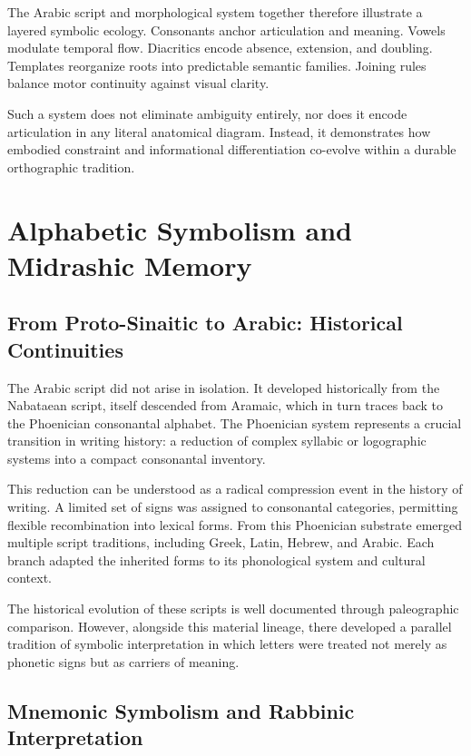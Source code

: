 \documentclass[11pt]{article}
\begin{document}
The Arabic script and morphological system together therefore illustrate a layered symbolic ecology. Consonants anchor articulation and meaning. Vowels modulate temporal flow. Diacritics encode absence, extension, and doubling. Templates reorganize roots into predictable semantic families. Joining rules balance motor continuity against visual clarity.

Such a system does not eliminate ambiguity entirely, nor does it encode articulation in any literal anatomical diagram. Instead, it demonstrates how embodied constraint and informational differentiation co-evolve within a durable orthographic tradition.

\section{Alphabetic Symbolism and Midrashic Memory}

\subsection{From Proto-Sinaitic to Arabic: Historical Continuities}

The Arabic script did not arise in isolation. It developed historically from the Nabataean script, itself descended from Aramaic, which in turn traces back to the Phoenician consonantal alphabet. The Phoenician system represents a crucial transition in writing history: a reduction of complex syllabic or logographic systems into a compact consonantal inventory.

This reduction can be understood as a radical compression event in the history of writing. A limited set of signs was assigned to consonantal categories, permitting flexible recombination into lexical forms. From this Phoenician substrate emerged multiple script traditions, including Greek, Latin, Hebrew, and Arabic. Each branch adapted the inherited forms to its phonological system and cultural context.

The historical evolution of these scripts is well documented through paleographic comparison. However, alongside this material lineage, there developed a parallel tradition of symbolic interpretation in which letters were treated not merely as phonetic signs but as carriers of meaning.

\subsection{Mnemonic Symbolism and Rabbinic Interpretation}
\end{document}
